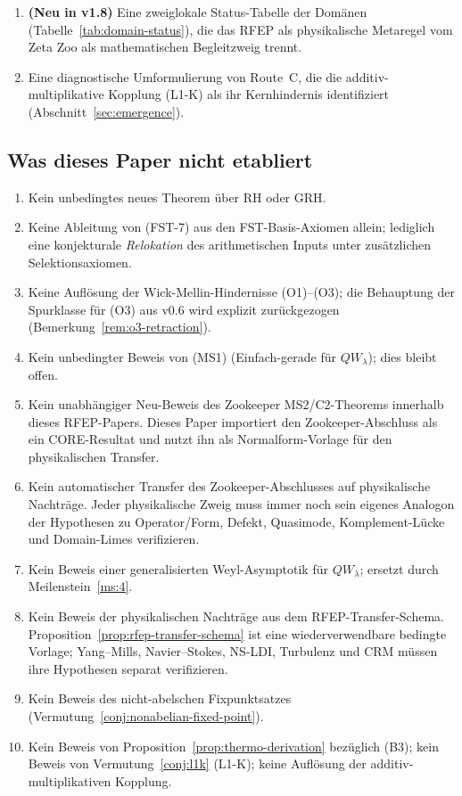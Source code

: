 \documentclass[11pt,a4paper]{article}
\theoremstyle{plain}
\theoremstyle{definition}
\begin{document}
\begin{enumerate}[leftmargin=*]
  Nachträge (Abschnitt~\ref{sec:rfep-physics-transfer}), das das
  Zookeeper-Operator-Muster in explizite Beweisverpflichtungen übersetzt:
  Operator/Form, Defekt, Galerkin-Treue, Komplement-Lücke und Rand-Limes.
\item \textbf{(Neu in v1.8)} Eine zweiglokale Status-Tabelle der Domänen
  (Tabelle~\ref{tab:domain-status}), die das RFEP als physikalische Metaregel
  vom Zeta Zoo als mathematischen Begleitzweig trennt.
\item Eine diagnostische Umformulierung von Route~C, die die
  additiv-multiplikative Kopplung (L1-K) als ihr Kernhindernis identifiziert
  (Abschnitt~\ref{sec:emergence}).
\end{enumerate}

\subsection{Was dieses Paper nicht etabliert}

\begin{enumerate}[leftmargin=*]
\item Kein unbedingtes neues Theorem über RH oder GRH.
\item Keine Ableitung von (FST-7) aus den FST-Basis-Axiomen allein;
  lediglich eine konjekturale \emph{Relokation} des arithmetischen Inputs
  unter zusätzlichen Selektionsaxiomen.
\item Keine Auflösung der Wick-Mellin-Hindernisse (O1)--(O3); die Behauptung der
  Spurklasse für (O3) aus v0.6 wird explizit zurückgezogen (Bemerkung~\ref{rem:o3-retraction}).
\item Kein unbedingter Beweis von (MS1) (Einfach-gerade für $QW_\lambda$);
  dies bleibt offen.
\item Kein unabhängiger Neu-Beweis des Zookeeper MS2/C2-Theorems innerhalb
  dieses RFEP-Papers. Dieses Paper importiert den Zookeeper-Abschluss als ein
  CORE-Resultat und nutzt ihn als Normalform-Vorlage für den physikalischen Transfer.
\item Kein automatischer Transfer des Zookeeper-Abschlusses auf physikalische
  Nachträge. Jeder physikalische Zweig muss immer noch sein eigenes Analogon
  der Hypothesen zu Operator/Form, Defekt, Quasimode, Komplement-Lücke und Domain-Limes verifizieren.
\item Kein Beweis einer generalisierten Weyl-Asymptotik für $QW_\lambda$;
  ersetzt durch Meilenstein~\ref{ms:4}.
\item Kein Beweis der physikalischen Nachträge aus dem RFEP-Transfer-Schema.
  Proposition~\ref{prop:rfep-transfer-schema} ist eine wiederverwendbare
  bedingte Vorlage; Yang--Mills, Navier--Stokes, NS-LDI, Turbulenz und CRM müssen
  ihre Hypothesen separat verifizieren.
\item Kein Beweis des nicht-abelschen Fixpunktsatzes
  (Vermutung~\ref{conj:nonabelian-fixed-point}).
\item Kein Beweis von Proposition~\ref{prop:thermo-derivation} bezüglich (B3);
  kein Beweis von Vermutung~\ref{conj:l1k} (L1-K); keine Auflösung der
  additiv-multiplikativen Kopplung.
\end{enumerate}
\end{document}
